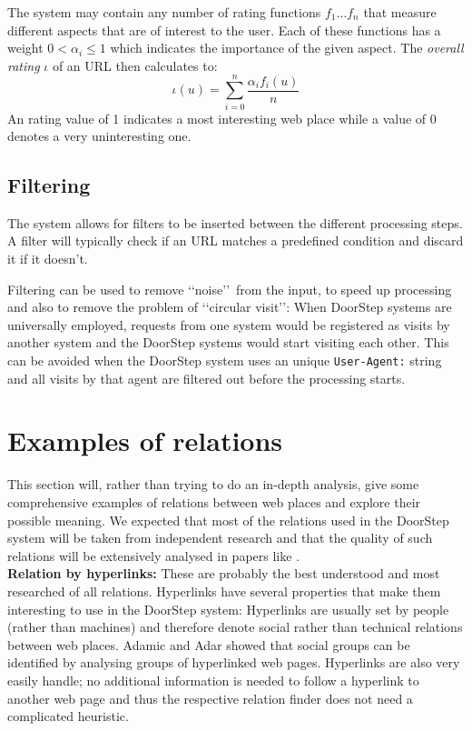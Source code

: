 \documentclass[a4paper]{danarticle}
\theoremstyle{remark}
\begin{document}
       The system may contain any number of rating functions $ f_1
       \dots f_n $ that measure different aspects that are of interest to
       the user.
       Each of these functions has a weight
       $ 0 < \alpha_i \leq 1 $ which indicates the importance of the given 
       aspect.
       The \textit{overall rating} $ \iota $ of an URL then calculates
       to:
       \[
         \iota(u) = \sum_{i = 0}^{n} 
	 \frac{\alpha_i f_i(u)}{n}
       \]
       An rating value of 1 indicates a most interesting web place
       while a
       value of 0 denotes a very uninteresting one. 
     \subsection{Filtering}
       The system allows for filters to be inserted between the different
       processing steps. A filter will typically check if an URL matches a
       predefined condition and discard it if it doesn't.
       
       Filtering can be used to remove \lq\lq noise\rq\rq\ from the input, to 
       speed up processing and also to remove the problem of 
       \lq\lq circular visit\rq\rq : When DoorStep systems are universally 
       employed, requests from one system would be registered as visits by 
       another system and the DoorStep systems would start visiting each other. 
       This can be avoided when the DoorStep system uses an unique 
       \verb$User-Agent:$ string and all visits by that agent are filtered out 
       before the processing starts.
  \section{Examples of relations}
    This section will, rather than trying to do an in-depth analysis, give some 
    comprehensive examples of relations between web places and explore their 
    possible meaning. We expected that most of the relations used in the 
    DoorStep system will be taken from independent research and that the quality 
    of such relations will be extensively analysed in papers like \cite{links}.
    \\
    
    \textbf{Relation by hyperlinks:} These are probably the best understood and 
    most researched of all relations. Hyperlinks have several properties that 
    make them interesting to use in the DoorStep system: Hyperlinks are usually 
    set by people (rather than machines) and therefore denote social rather than 
    technical relations between web places. Adamic and Adar showed that 
    social groups can be identified by analysing groups of hyperlinked web 
    pages\cite{links}. Hyperlinks are also very easily handle; no additional 
    information is 
    needed to follow a hyperlink to another web page and thus the respective 
    relation finder does not need a complicated heuristic.
    \\
    
\end{document}
